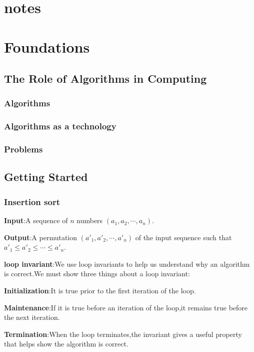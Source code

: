 \documentclass[UTF8,a4paper,12pt]{ctexart}
\begin{document}
    \pagestyle{plain}
    \section*{\huge{notes}}
    \section{Foundations}
        \subsection{The Role of Algorithms in Computing}
            \subsubsection{Algorithms}
            \subsubsection{Algorithms as a technology}
            \subsubsection{Problems}
        \subsection{Getting Started}
            \subsubsection{Insertion sort}
                \textbf{Input}:A sequence of $n$ numbers $(a_1,a_2,\cdots,a_n)$.

                \textbf{Output}:A permutation $(a'_1,a'_2,\cdots,a'_n)$ of the input sequence such that $a'_1 \leq a'_2 \leq \cdots \leq a'_n$.

                \textbf{loop invariant}:We use loop invariants to help us understand why an algorithm is correct.We must show three things about a loop invariant:

                \textbf{Initialization}:It is true prior to the first iteration of the loop.

                \textbf{Maintenance}:If it is true before an iteration of the loop,it remains true before the next iteration.

                \textbf{Termination}:When the loop terminates,the invariant gives a useful property that helps show the algorithm is correct.
\end{document}
